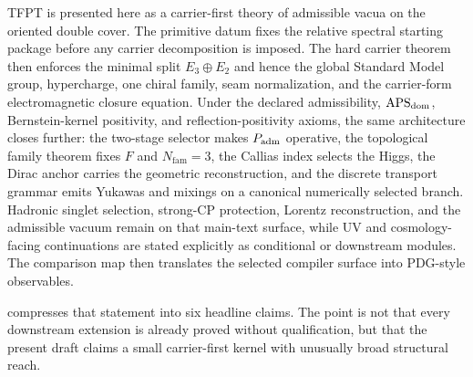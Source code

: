 TFPT is presented here as a carrier-first theory of admissible vacua on the oriented double cover. The primitive datum fixes the relative spectral starting package before any carrier decomposition is imposed. The hard carrier theorem then enforces the minimal split $E_3\oplus E_2$ and hence the global Standard Model group, hypercharge, one chiral family, seam normalization, and the carrier-form electromagnetic closure equation. Under the declared admissibility, $\mathrm{APS}_{\mathrm{dom}}$, Bernstein-kernel positivity, and reflection-positivity axioms, the same architecture closes further: the two-stage selector makes $P_{\mathrm{adm}}$ operative, the topological family theorem fixes $F$ and $N_{\mathrm{fam}}=3$, the Callias index selects the Higgs, the Dirac anchor carries the geometric reconstruction, and the discrete transport grammar emits Yukawas and mixings on a canonical numerically selected branch. Hadronic singlet selection, strong-CP protection, Lorentz reconstruction, and the admissible vacuum remain on that main-text surface, while UV and cosmology-facing continuations are stated explicitly as conditional or downstream modules. The comparison map then translates the selected compiler surface into PDG-style observables.

 compresses that statement into six headline claims. The point is
not that every downstream extension is already proved without qualification, but that the present
draft claims a small carrier-first kernel with unusually broad structural reach.

